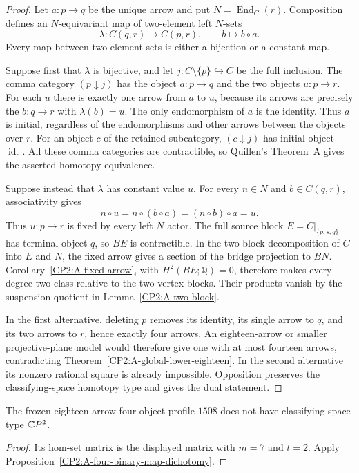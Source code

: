\begin{proof}
Let $a:p\to q$ be the unique arrow and put
$N=\operatorname{End}_C(r)$. Composition defines an
$N$-equivariant map of two-element left $N$-sets
\[
\lambda:C(q,r)\longrightarrow C(p,r),
\qquad b\longmapsto b\circ a.
\]
Every map between two-element sets is either a bijection
or a constant map.

Suppose first that $\lambda$ is bijective, and let
$j:C\setminus\{p\}\hookrightarrow C$ be the full inclusion.
The comma category $(p\downarrow j)$ has the object
$a:p\to q$ and the two objects $u:p\to r$.
For each $u$ there is exactly one arrow from $a$ to $u$,
because its arrows are precisely the $b:q\to r$ with
$\lambda(b)=u$. The only endomorphism of $a$ is the
identity. Thus $a$ is initial, regardless of the
endomorphisms and other arrows between the objects
over $r$. For an object $c$ of the retained subcategory,
$(c\downarrow j)$ has initial object $\operatorname{id}_c$.
All these comma categories are contractible, so
Quillen's Theorem~A gives the asserted homotopy
equivalence.

Suppose instead that $\lambda$ has constant value $u$.
For every $n\in N$ and $b\in C(q,r)$, associativity gives
\[
n\circ u=n\circ(b\circ a)=(n\circ b)\circ a=u.
\]
Thus $u:p\to r$ is fixed by every left $N$ actor.
The full source block $E=C|_{\{p,s,q\}}$ has terminal
object $q$, so $BE$ is contractible. In the two-block
decomposition of $C$ into $E$ and $N$, the fixed arrow
gives a section of the bridge projection to $BN$.
Corollary~\ref{CP2:A-fixed-arrow}, with
$H^2(BE;\mathbb Q)=0$, therefore makes every degree-two
class relative to the two vertex blocks. Their products
vanish by the suspension quotient in
Lemma~\ref{CP2:A-two-block}.

In the first alternative, deleting $p$ removes its
identity, its single arrow to $q$, and its two arrows
to $r$, hence exactly four arrows. An eighteen-arrow
or smaller projective-plane model would therefore give
one with at most fourteen arrows, contradicting
Theorem~\ref{CP2:A-global-lower-eighteen}. In the second
alternative its nonzero rational square is already
impossible. Opposition preserves the classifying-space
homotopy type and gives the dual statement.
\end{proof}

\begin{corollary}
\label{CP2:A-four-eighteen-profile-1508}
The frozen eighteen-arrow four-object profile $1508$
does not have classifying-space type $\mathbb{C}P^2$.
\end{corollary}
\begin{proof}
Its hom-set matrix is the displayed matrix with
$m=7$ and $t=2$. Apply
Proposition~\ref{CP2:A-four-binary-map-dichotomy}.
\end{proof}
